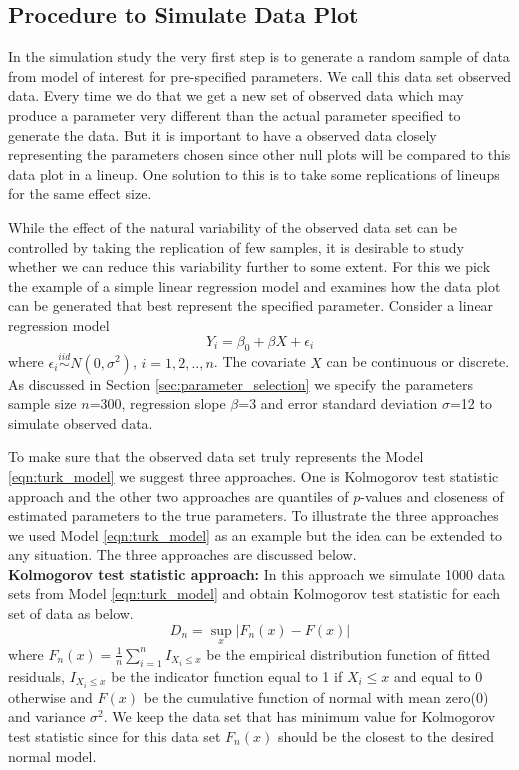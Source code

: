 \documentclass[11pt]{article}
\begin{document}
\subsection{Procedure to Simulate Data Plot} \label{sec:simulate_plot} In the simulation study the very first step is to generate a random sample of data from model of interest for pre-specified parameters. We call this data set observed data. Every time we do that we get a new set of observed data which may produce a parameter very different than the actual parameter specified to generate the data. But it is important to have a observed data closely representing the parameters chosen since other null plots will be compared to this data plot in a lineup. One solution to this is to take some replications of lineups for the same effect size. 

While the effect of the natural variability of the observed data set can be controlled by taking the replication of few samples, it is desirable to study whether we can reduce this variability further to some extent. For this we pick the example of a simple linear regression model and examines how the data plot can be generated that best represent the specified parameter.  Consider a linear regression model 
\begin{equation} \label{eqn:turk_model} 
Y_i = \beta_0 + \beta X  + \epsilon_i 
\end{equation}
where $\epsilon_i \stackrel{iid}{ \sim } N(0,\sigma^2)$, $i=1,2, .., n$. The covariate $X$ can be continuous or discrete. As discussed in Section \ref{sec:parameter_selection} we specify the parameters sample size $n$=300, regression slope $\beta$=3 and error standard deviation $\sigma$=12 to simulate observed data.

To make sure that the observed data set truly represents the Model \eqref{eqn:turk_model} we suggest three approaches. One is Kolmogorov test statistic approach and the other two approaches are quantiles of $p$-values and closeness of estimated parameters to the true parameters. To illustrate the three approaches we used Model \eqref{eqn:turk_model} as an example but the idea can be extended to any situation. The three approaches are discussed below. \\

{\bf Kolmogorov test statistic approach:} In this approach we simulate 1000 data sets from Model \eqref{eqn:turk_model}  and obtain Kolmogorov test statistic for each set of data as below. $$D_n=\sup_x |F_n(x)-F(x)|$$ where $F_n(x)=\frac1n \sum_{i=1}^n I_{X_i\le x}$ be the empirical distribution function of fitted residuals, $I_{X_i\le x}$ be the indicator function equal to 1 if $X_i\le x$ and equal to 0 otherwise and $F(x)$ be the cumulative function of normal with mean zero(0) and variance $\sigma^2$. We keep the data set that has minimum value for Kolmogorov test statistic since for this data set $F_n(x)$ should be the closest to the desired normal model.  \\
\end{document}
